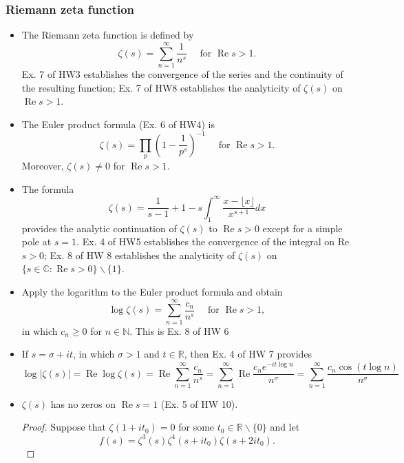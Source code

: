 \documentclass[12pt]{article}
\begin{document}
\subsubsection{Riemann zeta function}
\begin{itemize}
    \item
      The Riemann zeta function is defined by \[
      \zeta(s)=\sum_{n=1}^{\infty} \frac{1}{n^s} \quad \text { for } \operatorname{Re} s>1 .
      \] Ex. 7 of HW3 establishes the convergence of the series and the
      continuity of the resulting function; Ex. 7 of HW8 establishes the
      analyticity of \(\zeta(s)\) on \(\operatorname{Re} s>1\).
    \item
      The Euler product formula (Ex. 6 of HW4) is \[
      \zeta(s)=\prod_p\left(1-\frac{1}{p^s}\right)^{-1} \quad \text { for } \operatorname{Re} s>1 .
      \] Moreover, \(\zeta(s) \neq 0\) for \(\operatorname{Re} s>1\).
    \item
      The formula \[
      \zeta(s)=\frac{1}{s-1}+1-s \int_1^{\infty} \frac{x-\lfloor x\rfloor}{x^{s+1}} d x
      \] provides the analytic continuation of \(\zeta(s)\) to
      \(\operatorname{Re} s>0\) except for a simple pole at \(s=1\). Ex. 4
      of HW5 establishes the convergence of the integral on Re \(s>0\); Ex.
      8 of HW 8 establishes the analyticity of \(\zeta(s)\) on
      \(\{s \in \mathbb{C}: \operatorname{Re} s>0\} \backslash\{1\}\).
    \item
      Apply the logarithm to the Euler product formula and obtain \[
      \log \zeta(s)=\sum_{n=1}^{\infty} \frac{c_n}{n^s} \quad \text { for } \operatorname{Re} s>1,
      \] in which \(c_n \geq 0\) for \(n \in \mathbb{N}\). This is Ex. 8 of
      HW 6
    \item
      If \(s=\sigma+i t\), in which \(\sigma>1\) and \(t \in \mathbb{R}\),
      then Ex. 4 of HW 7 provides \[
      \log |\zeta(s)|=\operatorname{Re} \log \zeta(s)=\operatorname{Re} \sum_{n=1}^{\infty} \frac{c_n}{n^s}=\sum_{n=1}^{\infty} \operatorname{Re} \frac{c_n e^{-i t \log n}}{n^\sigma}=\sum_{n=1}^{\infty} \frac{c_n \cos (t \log n)}{n^\sigma}
      \]
      \item
  \(\zeta(s)\) has no zeros on \(\operatorname{Re} s=1\) (Ex. 5 of HW
  10).
  \begin{proof}
    Suppose that \(\zeta\left(1+i t_0\right)=0\) for some
\(t_0 \in \mathbb{R} \backslash\{0\}\) and let \[
f(s)=\zeta^3(s) \zeta^4\left(s+i t_0\right) \zeta\left(s+2 i t_0\right).
\]


\end{proof}
\end{itemize}
\end{document}
